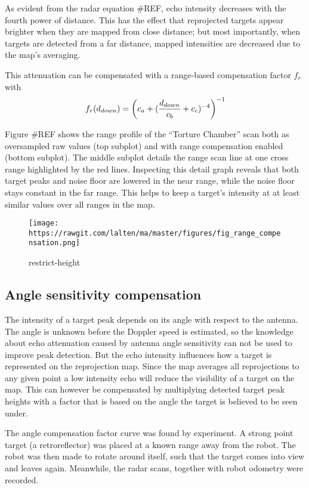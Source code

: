 As evident from the radar equation \#REF, echo intensity decreases with
the fourth power of distance. This has the effect that reprojected
targets appear brighter when they are mapped from close distance; but
most importantly, when targets are detected from a far distance, mapped
intensities are decreased due to the map's averaging.

This attenuation can be compensated with a range-based compensation
factor \(f_r\) with \[f_r(d_{down}) = {
\left(
c_a + (
{{d_{down}}\over{c_b}}
+ c_c)^{-4}
\right) ^ {-1}
}\]



Figure \#REF shows the range profile of the ``Torture Chamber'' scan
both as oversampled raw values (top subplot) and with range compensation
enabled (bottom subplot). The middle subplot details the range scan line
at one cross range highlighted by the red lines. Inspecting this detail
graph reveals that both target peaks and noise floor are lowered in the
near range, while the noise floor stays constant in the far range. This
helps to keep a target's intensity at at least similar values over all
ranges in the map.

\begin{figure}
\centering
\texttt{[image: https://rawgit.com/lalten/ma/master/figures/fig\_range\_compensation.png]}
\caption{restrict-height}
\end{figure}

\subsection{Angle sensitivity
compensation}\label{angle-sensitivity-compensation}

The intensity of a target peak depends on its angle with respect to the
antenna. The angle is unknown before the Doppler speed is estimated, so
the knowledge about echo attenuation caused by antenna angle sensitivity
can not be used to improve peak detection. But the echo intensity
influences how a target is represented on the reprojection map. Since
the map averages all reprojections to any given point a low intensity
echo will reduce the visibility of a target on the map. This can however
be compensated by multiplying detected target peak heights with a factor
that is based on the angle the target is believed to be seen under.

The angle compensation factor curve was found by experiment. A strong
point target (a retroreflector) was placed at a known range away from
the robot. The robot was then made to rotate around itself, such that
the target comes into view and leaves again. Meanwhile, the radar scans,
together with robot odometry were recorded.

